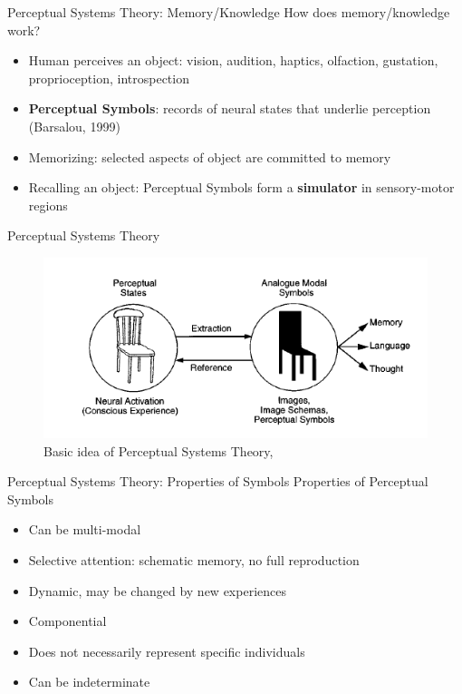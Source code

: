 \documentclass[12pt,a4paper]{beamer}
\begin{document}
\begin{frame}{Perceptual Systems Theory: Memory/Knowledge}
How does memory/knowledge work?
\begin{itemize}
\item Human perceives an object: vision, audition, haptics, olfaction, gustation, proprioception, introspection
\item \textbf{Perceptual Symbols}: records of neural states that underlie perception (Barsalou, 1999)
\item Memorizing: selected aspects of object are committed to memory
\item Recalling an object: Perceptual Symbols form a \textbf{simulator} in sensory-motor regions
\end{itemize}
\end{frame}

\begin{frame}{Perceptual Systems Theory}
\begin{figure}
\includegraphics[scale=0.8]{barsalou_figure_1_perceptual_symbol_systems.png}
\caption{Basic idea of Perceptual Systems Theory, \cite{barsalou}}
\end{figure}
\end{frame}


\begin{frame}{Perceptual Systems Theory: Properties of Symbols}
Properties of Perceptual Symbols
\begin{itemize}
\item Can be multi-modal
\item Selective attention: schematic memory, no full reproduction
\item Dynamic, may be changed by new experiences
\item Componential
\item Does not necessarily represent specific individuals
\item Can be indeterminate
\end{itemize}
\end{frame}
\end{document}
